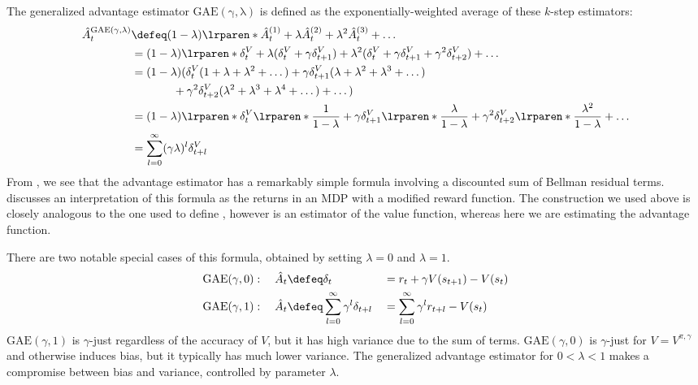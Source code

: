 \documentclass{article}
\newcommand{\dv}{\delta^V}
\newcommand{\hata}{\hat{A}}
\newcommand{\hatalam}{\hat{A}^{\mathrm{GAE(\gamma,\lambda)}}}
\newcommand{\delay}{l}
\newcommand{\Vpigam}{V^{\pi,\gamma}}
\newcommand{\just}{$\gamma$-just}
\newcommand{\GAE}{\mathrm{GAE}}
\begin{document}
The generalized advantage estimator $\mathrm{GAE(\gamma,\lambda)}$ is defined as the exponentially-weighted average of these $k$-step estimators:
\begin{align}
\hatalam_t
&\defeq (1-\lambda)\lrparen*{ \hata_t^{(1)} + \lambda \hata_t^{(2)} + \lambda^2 \hata_t^{(3)} + \dots  }\nonumber \\
&= (1-\lambda)\lrparen*{ \dv_t + \lambda (\dv_t + \gamma \dv_{t+1}) + \lambda^2 (\dv_t + \gamma \dv_{t+1} + \gamma^2 \dv_{t+2}) + \dots }\nonumber \\
&= (1-\lambda)(
\dv_t (1 + \lambda + \lambda^2 + \dots)
+\gamma \dv_{t+1} (\lambda + \lambda^2 + \lambda^3 + \dots)\nonumber \\
&\ \ \ \ \  \ \ \ \ \ \ +\gamma^2 \dv_{t+2} (\lambda^2 + \lambda^3 + \lambda^4 + \dots)
+\dots)
\nonumber \\
&= (1-\lambda)\lrparen*{
\dv_t \lrparen*{\frac{1}{1-\lambda}}
+\gamma \dv_{t+1} \lrparen*{\frac{\lambda}{1-\lambda}}
+\gamma^2 \dv_{t+2} \lrparen*{\frac{\lambda^2}{1-\lambda}}
+\dots}
\nonumber \\
&= \sum_{\delay=0}^{\infty} (\gamma \lambda)^{\delay} \dv_{t+\delay}
\label{eq:gaelam1}
\end{align}
From , we see that the advantage estimator has a remarkably simple formula involving a discounted sum of Bellman residual terms.
 discusses an interpretation of this formula as the returns in an MDP with a modified reward function.
The construction we used above is closely analogous to the one used to define \tdlam{} \citep{sutton1998introduction}, however \tdlam{} is an estimator of the value function, whereas here we are estimating the advantage function.

There are two notable special cases of this formula, obtained by setting $\lambda=0$ and $\lambda=1$.
\begin{alignat}{2}
\GAE(\gamma, 0):\ \ \ \hata_t &\defeq \delta_t &&= r_t + \gamma V(s_{t+1}) - V(s_t)\label{eq:adv-ac}\\
\GAE(\gamma, 1):\ \ \ \hata_t &\defeq \sum_{\delay=0}^{\infty} \gamma^{\delay} \delta_{t+\delay} &&= \sum_{\delay=0}^{\infty}\gamma^{\delay} r_{t+\delay} - V(s_t) \label{eq:adv-mc}
\end{alignat}
$\GAE(\gamma, 1)$ is \just{} regardless of the accuracy of $V$, but it has high variance due to the sum of terms.
$\GAE(\gamma, 0)$ is \just{} for $V = \Vpigam$ and otherwise induces bias, but it typically has much lower variance.
The generalized advantage estimator for $0 < \lambda < 1$ makes a compromise between bias and variance, controlled by parameter $\lambda$.
\end{document}
